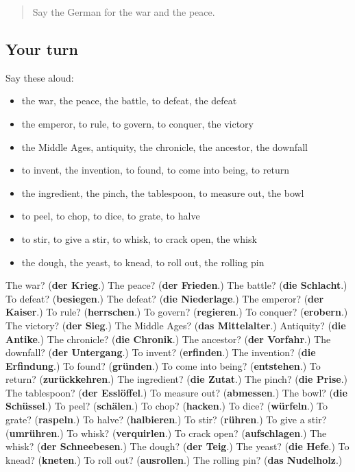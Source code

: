 \label{lesson:GE-R325-review-318-325}



\begin{quote}
Say the German for the war and the peace.
\end{quote}

\subsection*{Your turn}
Say these aloud:

\begin{itemize}
\raggedright
  \item the war, the peace, the battle, to defeat, the defeat
  \item the emperor, to rule, to govern, to conquer, the victory
  \item the Middle Ages, antiquity, the chronicle, the ancestor, the downfall
  \item to invent, the invention, to found, to come into being, to return
  \item the ingredient, the pinch, the tablespoon, to measure out, the bowl
  \item to peel, to chop, to dice, to grate, to halve
  \item to stir, to give a stir, to whisk, to crack open, the whisk
  \item the dough, the yeast, to knead, to roll out, the rolling pin
\end{itemize}

\begin{tcolorbox}[breakable,colback=teal!4,colframe=teal!35!black,title={Before you move on}]
The war? (\textbf{der Krieg}.) The peace? (\textbf{der Frieden}.) The battle? (\textbf{die Schlacht}.) To defeat? (\textbf{besiegen}.) The defeat? (\textbf{die Niederlage}.) The emperor? (\textbf{der Kaiser}.) To rule? (\textbf{herrschen}.) To govern? (\textbf{regieren}.) To conquer? (\textbf{erobern}.) The victory? (\textbf{der Sieg}.) The Middle Ages? (\textbf{das Mittelalter}.) Antiquity? (\textbf{die Antike}.) The chronicle? (\textbf{die Chronik}.) The ancestor? (\textbf{der Vorfahr}.) The downfall? (\textbf{der Untergang}.) To invent? (\textbf{erfinden}.) The invention? (\textbf{die Erfindung}.) To found? (\textbf{gründen}.) To come into being? (\textbf{entstehen}.) To return? (\textbf{zurückkehren}.) The ingredient? (\textbf{die Zutat}.) The pinch? (\textbf{die Prise}.) The tablespoon? (\textbf{der Esslöffel}.) To measure out? (\textbf{abmessen}.) The bowl? (\textbf{die Schüssel}.) To peel? (\textbf{schälen}.) To chop? (\textbf{hacken}.) To dice? (\textbf{würfeln}.) To grate? (\textbf{raspeln}.) To halve? (\textbf{halbieren}.) To stir? (\textbf{rühren}.) To give a stir? (\textbf{umrühren}.) To whisk? (\textbf{verquirlen}.) To crack open? (\textbf{aufschlagen}.) The whisk? (\textbf{der Schneebesen}.) The dough? (\textbf{der Teig}.) The yeast? (\textbf{die Hefe}.) To knead? (\textbf{kneten}.) To roll out? (\textbf{ausrollen}.) The rolling pin? (\textbf{das Nudelholz}.)
\end{tcolorbox}
